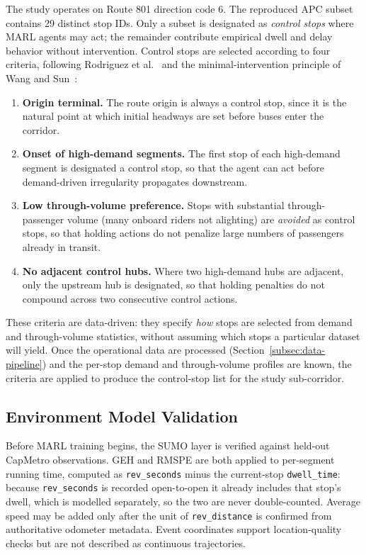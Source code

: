 The study operates on Route 801 direction code 6. The reproduced APC subset contains 29 distinct stop IDs. Only a subset is designated as \textit{control stops} where MARL agents may act; the remainder contribute empirical dwell and delay behavior without intervention. Control stops are selected according to four criteria, following Rodriguez et al.~\cite{Rodriguez2023Cooperative} and the minimal-intervention principle of Wang and Sun~\cite{Wangsun}:

\begin{enumerate}
    \item \textbf{Origin terminal.} The route origin is always a control stop, since it is the natural point at which initial headways are set before buses enter the corridor.
    \item \textbf{Onset of high-demand segments.} The first stop of each high-demand segment is designated a control stop, so that the agent can act before demand-driven irregularity propagates downstream.
    \item \textbf{Low through-volume preference.} Stops with substantial through-passenger volume (many onboard riders not alighting) are \textit{avoided} as control stops, so that holding actions do not penalize large numbers of passengers already in transit.
    \item \textbf{No adjacent control hubs.} Where two high-demand hubs are adjacent, only the upstream hub is designated, so that holding penalties do not compound across two consecutive control actions.
\end{enumerate}

These criteria are data-driven: they specify \textit{how} stops are selected from demand and through-volume statistics, without assuming which stops a particular dataset will yield. Once the operational data are processed (Section~\ref{subsec:data-pipeline}) and the per-stop demand and through-volume profiles are known, the criteria are applied to produce the control-stop list for the study sub-corridor.

\subsection{Environment Model Validation}

Before MARL training begins, the SUMO layer is verified against held-out CapMetro observations. GEH and RMSPE are both applied to per-segment running time, computed as \texttt{rev\_seconds} minus the current-stop \texttt{dwell\_time}: because \texttt{rev\_seconds} is recorded open-to-open it already includes that stop's dwell, which is modelled separately, so the two are never double-counted. Average speed may be added only after the unit of \texttt{rev\_distance} is confirmed from authoritative odometer metadata. Event coordinates support location-quality checks but are not described as continuous trajectories.

